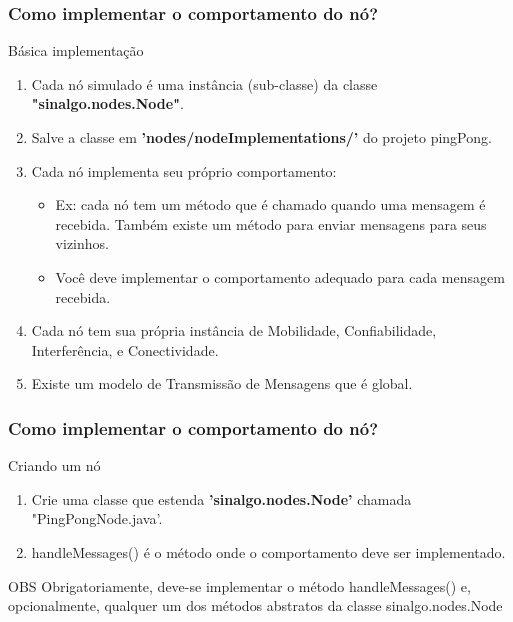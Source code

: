 \documentclass{beamer}
\begin{document}
\begin{frame}
	\frametitle{Como implementar o comportamento do nó?}
	
	\begin{block}{Básica implementação}
		\begin{enumerate}
			\item Cada nó simulado é uma instância (sub-classe) da classe \textbf{"sinalgo.nodes.Node"}.
			\item Salve a classe em \textbf{'nodes/nodeImplementations/'} do projeto pingPong.
			\item Cada nó implementa seu próprio comportamento:
			\begin{itemize}
				\item Ex: cada nó tem um método que é chamado quando uma mensagem é recebida. Também existe um método para enviar mensagens para seus vizinhos.
				\item Você deve implementar o comportamento adequado para cada mensagem recebida.
			\end{itemize}
			\item Cada nó tem sua própria instância de Mobilidade, Confiabilidade, Interferência, e Conectividade.
			\item Existe um modelo de Transmissão de Mensagens que é global.
			
		\end{enumerate}
	\end{block}	
	
\end{frame}


\begin{frame}
	\frametitle{Como implementar o comportamento do nó?}
	
	\begin{block}{Criando um nó}
		\begin{enumerate}
			\item Crie uma classe que estenda \textbf{'sinalgo.nodes.Node'} chamada "PingPongNode.java'.
			\item handleMessages() é o método onde o comportamento deve ser implementado.
		\end{enumerate}
			
	\end{block}	
	
	\begin{alertblock}{OBS}
	Obrigatoriamente, deve-se implementar o método 
handleMessages() e, opcionalmente, qualquer 
um dos métodos abstratos da classe 
sinalgo.nodes.Node
	\end{alertblock}
	
\end{frame}
\end{document}

